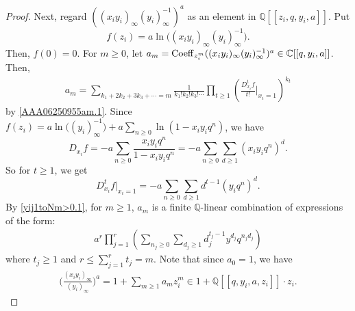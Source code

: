 \documentclass[12pt, reqno]{amsart}
\theoremstyle{definition}
\theoremstyle{remark}
\numberwithin{equation}{section}
\newcommand{\C}{ \mathbb C }
\newcommand{\Coe}{ {\rm Coeff} }
\newcommand{\Q}{ \mathbb Q }
\numberwithin{equation}{section}
\begin{document}
\begin{proof}
Next, regard $((x_iy_i)_\infty (y_i)_\infty^{-1})^a$ 
as an element in $\Q[[z_i,q,y_i,a]]$. Put
$$
f(z_i) = a \ln\big ((x_iy_i)_\infty (y_i)_\infty^{-1} \big ).
$$
Then, $f(0) = 0$. For $m \ge 0$, let $a_{m} = \Coe_{z_i^m} 
((x_iy_i)_\infty (y_i)_\infty^{-1})^a \in \C[[q,y_i, a]]$. 
Then,
\begin{eqnarray}   \label{yij1toNm>0.1}
  a_{m}
= \sum_{k_1+2k_2+3k_3+\cdots = m}
  \frac{1}{k_1! k_2! k_3! \cdots} \prod_{t \ge 1}
  \left (\frac{D_{x_i}^t f}{t!} \Big |_{x_i=1}\right )^{k_t}
\end{eqnarray} 
by \eqref{AAA06250955am.1}.
Since $f(z_i) = a \ln\big ((y_i)_\infty^{-1} \big ) 
+ a \sum_{n \ge 0} \ln (1-x_iy_iq^n)$, we have
$$ 
   D_{x_i}f  
= -a \sum_{n \ge 0} \frac{x_iy_iq^n}{1-x_iy_iq^n}  
= -a \sum_{n \ge 0} \sum_{d \ge 1} (x_iy_iq^n)^d.
$$
So for $t \ge 1$, we get 
$$
  D_{x_i}^tf|_{x_i=1} 
= -a \sum_{n \ge 0} \sum_{d \ge 1} d^{t-1} (y_iq^n)^d. 
$$
By \eqref{yij1toNm>0.1}, for $m \ge 1$, $a_m$ is 
a finite $\Q$-linear combination of expressions of the form:
\begin{eqnarray}   \label{yij1toNm>0.2}
a^r \prod_{j=1}^r \left (\sum_{n_j \ge 0} \sum_{d_j \ge 1} 
d_j^{t_j-1} y^{d_j}q^{n_j d_j} \right )
\end{eqnarray}
where $t_j \ge 1$ and $r \le \sum_{j=1}^r t_j = m$. 
Note that since $a_0 = 1$, 
we have
\begin{eqnarray}   \label{yij1toNm>0.3}
   \bigg (\frac{(x_iy_i)_\infty}{(y_i)_\infty} \bigg )^a
= 1 + \sum_{m \ge 1} a_m z_i^m
\in 1 + \Q[[q, y_i, a, z_i]] \cdot z_i. 
\end{eqnarray}


\end{proof}
\end{document}
